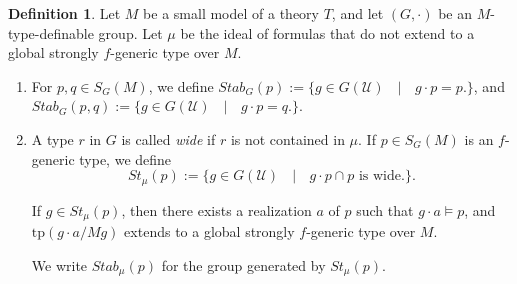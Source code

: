 \documentclass[12pt]{article}
\newcommand{\tpp}{\mathrm{tp}}
\newcommand{\0}{\emptyset}
\newcommand{\U}{\mathcal{U}}
\theoremstyle{plain}%
\theoremstyle{definition}
\newtheorem{defn}[thm]{Definition}
\theoremstyle{remark}
\begin{document}
\begin{defn} Let $M$ be a small model of a theory $T$, and let $(G, \cdot)$ be an $M$-type-definable group. Let $\mu$ be the ideal of formulas that do not extend to a global strongly $f$-generic type over $M$. 




\begin{enumerate}
    \item For $p, q\in S_G(M)$, we define $Stab_G(p):=\{g\in G(\U)\textit{ $\mid$ }g\cdot p = p.   \}$, and $Stab_G(p,q):=\{g\in G(\U)\textit{ $\mid$ }g\cdot p = q.   \}$. 
    
    \item  A type $r$ in $G$ is called \textit{wide} if $r$ is not contained in $\mu$. If $p\in S_G(M)$ is an $f$-generic type, we define $$St_{\mu}(p):=\{g\in G(\U) \textit{ $\mid$ } g\cdot p \cap p \text{ is wide.}\}.$$

If $g\in St_{\mu}(p)$, then there exists a realization $a$ of $p$ such that $g\cdot a\models p$, and $\tpp(g\cdot a/Mg)$ extends to a global strongly $f$-generic type over $M$.




    
    We write $Stab_{\mu}(p)$ for the group generated by $St_{\mu}(p)$.   
  

    
\end{enumerate}
    \end{defn}
\end{document}
